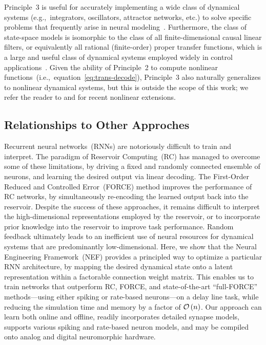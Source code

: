 Principle~3 is useful for accurately implementing a wide class of dynamical systems (e.g.,~integrators, oscillators, attractor networks, etc.) to solve specific problems that frequently arise in neural modeling~\citep[e.g.,][]{eliasmith2000b, singh2004, eliasmith2005b, singh2006}.
Furthermore, the class of state-space models is isomorphic to the class of all finite-dimensional causal linear filters, or equivalently all rational (finite-order) proper transfer functions, which is a large and useful class of dynamical systems employed widely in control applications~\citep{brogan1982modern}.
Given the ability of Principle~2 to compute nonlinear functions~(i.e.,~equation~\ref{eq:trans-decode}), Principle~3 also naturally generalizes to nonlinear dynamical systems, but this is outside the scope of this work; we refer the reader to \citet{voelker2017iscas} and \citet{voelker2017neuromorphic} for recent nonlinear extensions.

\subsection{Relationships to Other Approches}

Recurrent neural networks~(RNNs) are notoriously difficult to train and interpret.
The paradigm of Reservoir Computing~(RC) has managed to overcome some of these limitations, by driving a fixed and randomly connected ensemble of neurons, and learning the desired output via linear decoding.
The First-Order Reduced and Controlled Error~(FORCE) method improves the performance of RC networks, by simultaneously re-encoding the learned output back into the reservoir. 
Despite the success of these approaches, it remains difficult to interpret the high-dimensional representations employed by the reservoir, or to incorporate prior knowledge into the reservoir to improve task performance.
Random feedback ultimately leads to an inefficient use of neural resources for dynamical systems that are predominantly low-dimensional.
Here, we show that the Neural Engineering Framework~(NEF) provides a principled way to optimize a particular RNN architecture, by mapping the desired dynamical state onto a latent representation within a factorable connection weight matrix.
This enables us to train networks that outperform RC, FORCE, and state-of-the-art ``full-FORCE'' methods---using either spiking or rate-based neurons---on a delay line task, while reducing the simulation time and memory by a factor of $\mathcal{O}\left({n}\right)$.
Our approach can learn both online and offline, readily incorporates detailed synapse models, supports various spiking and rate-based neuron models, and may be compiled onto analog and digital neuromorphic hardware.

